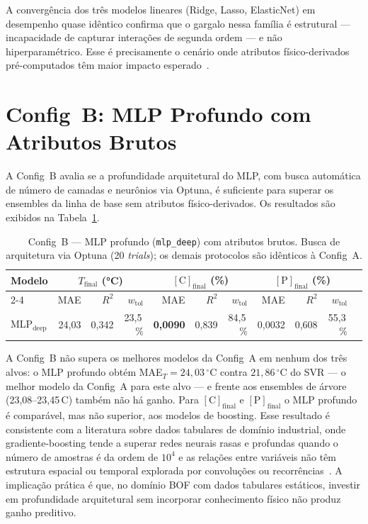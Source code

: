 A convergência dos três modelos lineares (Ridge, Lasso, ElasticNet) em desempenho quase idêntico confirma que o gargalo nessa família é estrutural --- incapacidade de capturar interações de segunda ordem --- e não hiperparamétrico. Esse é precisamente o cenário onde atributos físico-derivados pré-computados têm maior impacto esperado~\cite{willard2020integrating,chattopadhyay2022hybrid}.


\section{Config~B: MLP Profundo com Atributos Brutos}
\label{sec:resultados-B}

A Config~B avalia se a profundidade arquitetural do MLP, com busca automática de número de camadas e neurônios via Optuna, é suficiente para superar os ensembles da linha de base sem atributos físico-derivados. Os resultados são exibidos na Tabela~\ref{tbl:resultados_configB}.

\begin{table}[H]
\caption{Config~B --- MLP profundo (\texttt{mlp\_deep}) com atributos brutos. Busca de arquitetura via Optuna (20 \textit{trials}); os demais protocolos são idênticos à Config~A.}
\label{tbl:resultados_configB}
\centering
\footnotesize
\setlength{\tabcolsep}{5pt}
\begin{tabular}{lrrrrrrrrrr}
\hline
\textbf{Modelo} &
  \multicolumn{3}{c}{$T_\text{final}$ (°C)} &
  \multicolumn{3}{c}{$[\text{C}]_\text{final}$ (\%)} &
  \multicolumn{3}{c}{$[\text{P}]_\text{final}$ (\%)} \\
\cline{2-4}\cline{5-7}\cline{8-10}
 & MAE & $R^2$ & $w_\text{tol}$ & MAE & $R^2$ & $w_\text{tol}$ & MAE & $R^2$ & $w_\text{tol}$ \\
\hline
MLP$_\text{deep}$ & 24,03 & 0,342 & 23,5\,\% & \textbf{0,0090} & 0,839 & 84,5\,\% & 0,0032 & 0,608 & 55,3\,\% \\
\hline
\end{tabular}
\end{table}

A Config~B não supera os melhores modelos da Config~A em nenhum dos três alvos: o MLP profundo obtém MAE$_{T} = 24{,}03\,^\circ\text{C}$ contra $21{,}86\,^\circ\text{C}$ do SVR --- o melhor modelo da Config~A para este alvo --- e frente aos ensembles de árvore (23{,}08--23{,}45\,\textdegree C) também não há ganho. Para $[\text{C}]_\text{final}$ e $[\text{P}]_\text{final}$ o MLP profundo é comparável, mas não superior, aos modelos de boosting. Esse resultado é consistente com a literatura sobre dados tabulares de domínio industrial, onde gradiente-boosting tende a superar redes neurais rasas e profundas quando o número de amostras é da ordem de $10^4$ e as relações entre variáveis não têm estrutura espacial ou temporal explorada por convoluções ou recorrências~\cite{grinsztajn2022tree,shwartz2022tabular}. A implicação prática é que, no domínio BOF com dados tabulares estáticos, investir em profundidade arquitetural sem incorporar conhecimento físico não produz ganho preditivo.


